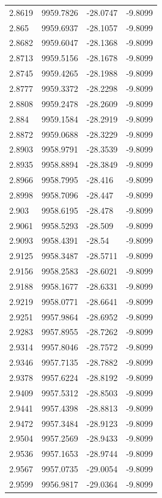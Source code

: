 \begin{table}[H]
\begin{tabular}{llll}
2.8619 & 9959.7826 & -28.0747 & -9.8099 \\
2.865 & 9959.6937 & -28.1057 & -9.8099 \\
2.8682 & 9959.6047 & -28.1368 & -9.8099 \\
2.8713 & 9959.5156 & -28.1678 & -9.8099 \\
2.8745 & 9959.4265 & -28.1988 & -9.8099 \\
2.8777 & 9959.3372 & -28.2298 & -9.8099 \\
2.8808 & 9959.2478 & -28.2609 & -9.8099 \\
2.884 & 9959.1584 & -28.2919 & -9.8099 \\
2.8872 & 9959.0688 & -28.3229 & -9.8099 \\
2.8903 & 9958.9791 & -28.3539 & -9.8099 \\
2.8935 & 9958.8894 & -28.3849 & -9.8099 \\
2.8966 & 9958.7995 & -28.416 & -9.8099 \\
2.8998 & 9958.7096 & -28.447 & -9.8099 \\
2.903 & 9958.6195 & -28.478 & -9.8099 \\
2.9061 & 9958.5293 & -28.509 & -9.8099 \\
2.9093 & 9958.4391 & -28.54 & -9.8099 \\
2.9125 & 9958.3487 & -28.5711 & -9.8099 \\
2.9156 & 9958.2583 & -28.6021 & -9.8099 \\
2.9188 & 9958.1677 & -28.6331 & -9.8099 \\
2.9219 & 9958.0771 & -28.6641 & -9.8099 \\
2.9251 & 9957.9864 & -28.6952 & -9.8099 \\
2.9283 & 9957.8955 & -28.7262 & -9.8099 \\
2.9314 & 9957.8046 & -28.7572 & -9.8099 \\
2.9346 & 9957.7135 & -28.7882 & -9.8099 \\
2.9378 & 9957.6224 & -28.8192 & -9.8099 \\
2.9409 & 9957.5312 & -28.8503 & -9.8099 \\
2.9441 & 9957.4398 & -28.8813 & -9.8099 \\
2.9472 & 9957.3484 & -28.9123 & -9.8099 \\
2.9504 & 9957.2569 & -28.9433 & -9.8099 \\
2.9536 & 9957.1653 & -28.9744 & -9.8099 \\
2.9567 & 9957.0735 & -29.0054 & -9.8099 \\
2.9599 & 9956.9817 & -29.0364 & -9.8099 \\

\end{tabular}
\end{table}
